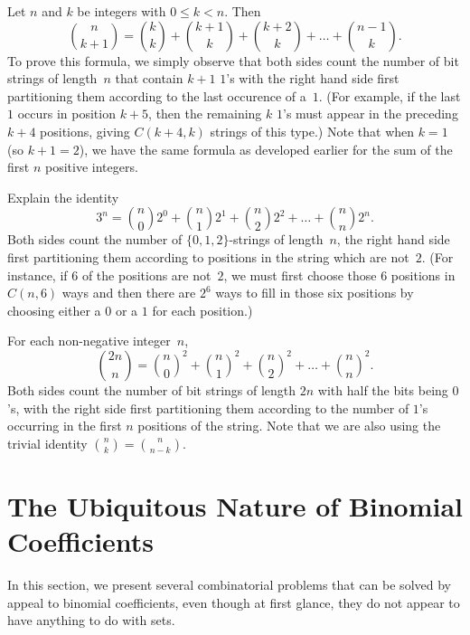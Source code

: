 \begin{example}
Let $n$ and $k$ be integers with $0\le k<n$.
Then
\[
\binom{n}{k+1} = \binom{k}{k} + \binom{k+1}{k} +
\binom{k+2}{k} +\dots+
\binom{n-1}{k}.
\]
To prove this formula, we simply observe that both sides count the
number of bit strings of length~$n$ that contain $k+1$ $1$'s with the
right hand side first partitioning them according to the last
occurence of a~$1$. (For example, if the last $1$ occurs in position
$k+5$, then the remaining $k$ $1$'s must appear in the preceding $k+4$
positions, giving $C(k+4,k)$ strings of this type.)  Note that
when $k=1$ (so $k+1=2$), we have the same formula as developed earlier for the
sum of the first $n$ positive integers.
\end{example}

\begin{example}
Explain the identity
\[3^n=\binom{n}{0}2^0+\binom{n}{1}2^1+\binom{n}{2}2^2+
\dots+\binom{n}{n}2^n.
\]
Both sides count the number of $\{0,1,2\}$-strings of length~$n$,
the right hand side first partitioning them according to positions
in the string which are not~$2$. (For instance, if $6$ of the
positions are not~$2$, we must first choose those $6$ positions in
$C(n,6)$ ways and then there are $2^6$ ways to fill in those six
positions by choosing either a $0$ or a $1$ for each position.)
\end{example}

\begin{example}
For each non-negative integer~$n$,
\[
\binom{2n}{n}=
{\binom{n}{0}}^2+{\binom{n}{1}}^2+{\binom{n}{2}}^2+\dots+
 {\binom{n}{n}}^2.
\]
Both sides count the number of bit strings of length $2n$ with half
the bits being $0$'s, with the right side first partitioning them
according to the number of $1$'s occurring in the first $n$ positions
of the string.  Note that we are also using the trivial identity
$\binom{n}{k}=\binom{n}{n-k}$.
\end{example}

\section{The Ubiquitous Nature of Binomial Coefficients}\label{s:strings:bin-coeff}

In this section, we present several combinatorial problems
that can be solved by appeal to binomial coefficients,
even though at first glance, they do not appear to have
anything to do with sets.

